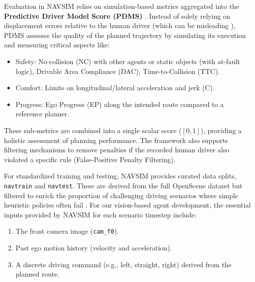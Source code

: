 \documentclass{article}
\begin{document}
Evaluation in NAVSIM relies on simulation-based metrics aggregated into the \textbf{Predictive Driver Model Score (PDMS)} \cite{dauner2024navsim, hallgarten2023pdm}. Instead of solely relying on displacement errors relative to the human driver (which can be misleading \cite{zhairet2023rethinking}), PDMS assesses the quality of the planned trajectory by simulating its execution and measuring critical aspects like:
\begin{itemize}
    \item Safety: No-collision (NC) with other agents or static objects (with at-fault logic), Drivable Area Compliance (DAC), Time-to-Collision (TTC).
    \item Comfort: Limits on longitudinal/lateral acceleration and jerk (C).
    \item Progress: Ego Progress (EP) along the intended route compared to a reference planner.
\end{itemize}
These sub-metrics are combined into a single scalar score ($[0, 1]$), providing a holistic assessment of planning performance. The framework also supports filtering mechanisms to remove penalties if the recorded human driver also violated a specific rule (False-Positive Penalty Filtering).

For standardized training and testing, NAVSIM provides curated data splits, \texttt{navtrain} and \texttt{navtest}. These are derived from the full OpenScene dataset but filtered to enrich the proportion of challenging driving scenarios where simple heuristic policies often fail \cite{dauner2024navsim}. For our vision-based agent development, the essential inputs provided by NAVSIM for each scenario timestep include:
\begin{enumerate}
    \item The front camera image (\texttt{cam\_f0}).
    \item Past ego motion history (velocity and acceleration).
    \item A discrete driving command (e.g., left, straight, right) derived from the planned route.
\end{enumerate}
\end{document}
